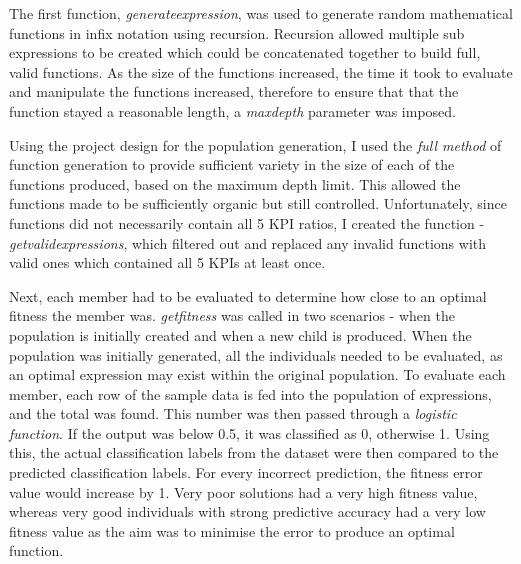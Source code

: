 \documentclass[11pt]{article}
\begin{document}
The first function, \textit{generate\textunderscore expression}, was used to generate random mathematical functions in infix notation using recursion. Recursion allowed multiple sub expressions to be created which could be concatenated together to build full, valid functions. 
As the size of the functions increased, the time it took to evaluate and manipulate the functions increased, therefore to ensure that that the function stayed a reasonable length, a \textit{max\textunderscore depth} parameter was imposed.

Using the project design for the population generation, I used the \textit{full method} \cite{ref-koz} of function generation to provide sufficient variety in the size of each of the functions produced, based on the maximum depth limit. This allowed the functions made to be sufficiently organic but still controlled. 
Unfortunately, since functions did not necessarily contain all 5 KPI ratios, I created the function - \textit{get\textunderscore valid\textunderscore expressions}, which filtered out and replaced any invalid functions with valid ones which contained all 5 KPIs at least once. 

Next, each member had to be evaluated to determine how close to an optimal fitness the member was. \textit{get\textunderscore fitness} was called in two scenarios - when the population is initially created and when a new child is produced. When the population was initially generated, all the individuals needed to be evaluated, as an optimal expression may exist within the original population. To evaluate each member, each row of the sample data is fed into the population of expressions, and the total was found. This number was then passed through a \textit{logistic function}. If  the output was below 0.5, it was classified as 0, otherwise 1. Using this, the actual classification labels from the dataset were then compared to the predicted classification labels. For every incorrect prediction, the fitness error value would increase by 1. Very poor solutions had a very high fitness value, whereas very good individuals with strong predictive accuracy had a very low fitness value as the aim was to minimise the error to produce an optimal function.\\
\end{document}

